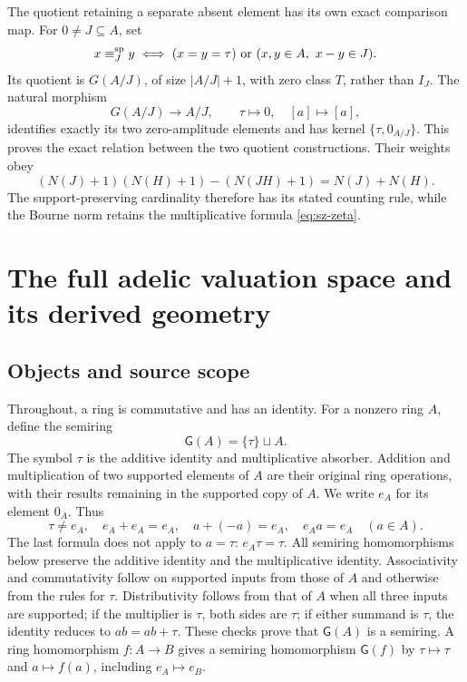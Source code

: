 \documentclass[11pt,a4paper]{article}
\theoremstyle{definition}\newtheorem{definition}[theorem]{Definition}
\newcommand{\G}{\mathsf G}\newcommand{\Tor}{\operatorname{Tor}}\newcommand{\Frac}{\operatorname{Frac}}
\begin{document}
The quotient retaining a separate absent element has its own exact
comparison map. For \(0\ne J\subseteq A\), set
\[
 x\equiv_J^{\rm sp}y
 \iff (x=y=\tau)\ \text{or}\ (x,y\in A,\ x-y\in J).
\]
Its quotient is \(G(A/J)\), of size \(|A/J|+1\), with zero class
\(T\), rather than \(I_J\). The natural morphism
\[
 G(A/J)\longrightarrow A/J,\qquad
 \tau\mapsto0,\quad[a]\mapsto[a],
\]
identifies exactly its two zero-amplitude elements and has kernel
\(\{\tau,0_{A/J}\}\). This proves the exact relation between the
two quotient constructions. Their weights obey
\[
 (N(J)+1)(N(H)+1)-(N(JH)+1)=N(J)+N(H).
\]
The support-preserving cardinality therefore has its stated counting
rule, while the Bourne norm retains the multiplicative formula
\eqref{eq:sz-zeta}.



\section{The full adelic valuation space and its derived geometry}


\subsection{Objects and source scope}

Throughout, a ring is commutative and has an identity. For a nonzero ring
$A$, define the semiring
\[
 \G(A)=\{\tau\}\sqcup A.
\]
The symbol $\tau$ is the additive identity and multiplicative absorber.
Addition and multiplication of two supported elements of $A$ are their
original ring operations, with their results remaining in the supported
copy of $A$. We write $e_A$ for its element $0_A$. Thus
\[
 \tau\ne e_A,\quad e_A+e_A=e_A,\quad
 a+(-a)=e_A,\quad e_Aa=e_A\quad(a\in A).
 \tag{AV1.1}\label{eq:split-identities}
\]
The last formula does not apply to $a=\tau$: $e_A\tau=\tau$.
All semiring homomorphisms below preserve the additive identity and the
multiplicative identity. Associativity and commutativity follow on supported
inputs from those of $A$ and otherwise from the rules for $\tau$.
Distributivity follows from that of $A$ when all three inputs are supported;
if the multiplier is $\tau$, both sides are $\tau$; if either summand is
$\tau$, the identity reduces to $a b=a b+\tau$. These checks prove that
$\G(A)$ is a semiring. A ring homomorphism $f:A\to B$ gives a semiring
homomorphism $\G(f)$ by $\tau\mapsto\tau$ and $a\mapsto f(a)$, including
$e_A\mapsto e_B$.
\end{document}
